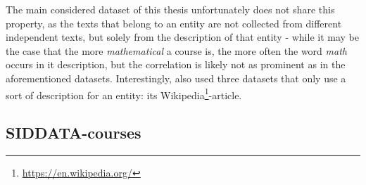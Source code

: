 The main considered dataset of this thesis unfortunately does not share this property, as the texts that belong to an entity are not collected from different independent texts, but solely from the description of that entity - while it may be the case that the more \emph{mathematical} a course is, the more often the word \emph{math} occurs in it description, but the correlation is likely not as prominent as in the aforementioned datasets. Interestingly, \cite{Alshaikh2020} also used three datasets that only use a sort of description for an entity: its Wikipedia\footnote{\url{https://en.wikipedia.org/}}-article.




\subsection{SIDDATA-courses}

\label{sec:dataset_siddata}


